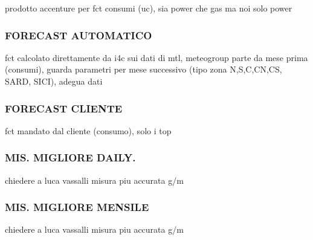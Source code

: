 prodotto accenture per fct consumi (uc), sia power che gas ma noi solo power
\subsubsection{FORECAST AUTOMATICO}
    fct calcolato direttamente da i4c
    sui dati di mtl, meteogroup
    parte da mese prima (consumi), guarda parametri per mese successivo (tipo zona N,S,C,CN,CS, SARD, SICI), adegua dati
\subsubsection{FORECAST CLIENTE}
    fct mandato dal cliente (consumo), solo i top
\subsubsection{MIS. MIGLIORE DAILY.}
    chiedere a luca vassalli
    misura piu accurata g/m 
\subsubsection{MIS. MIGLIORE MENSILE}
    chiedere a luca vassalli
    misura piu accurata g/m 